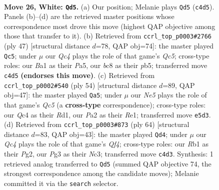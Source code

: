 \documentclass[11pt]{article}
\begin{document}
\clearpage

\begin{figure}[p]\centering
\begin{subfigure}{0.46\textwidth}\centering
\resizebox{\linewidth}{!}{%
\newchessgame
\chessboard[
  setfen={r1b3k1/1p1nq2p/4r3/p3Npp1/2Q5/4P1P1/P4PKP/BR2R3 w - - 0 26},
  showmover=false,
  pgfstyle=straightmove, color=movearrow, markmove={c4-d5}
]}
\caption{}
\end{subfigure}\hfill
\begin{subfigure}{0.46\textwidth}\centering
\resizebox{\linewidth}{!}{%
\newchessgame
\chessboard[
  setfen={r2r2k1/1p3pp1/4p2p/pP3n2/2q5/P1N4R/2Q3PP/2B1KR2 b - - 4 24},
  showmover=false,
  pgfstyle=straightmove, color=movearrow, markmove={c4-c5}
]}
\caption{}
\end{subfigure}
\\[4pt]
\begin{subfigure}{0.46\textwidth}\centering
\resizebox{\linewidth}{!}{%
\newchessgame
\chessboard[
  setfen={3rr3/p1pn1q1k/2p4p/2Q2p2/4p3/1P4P1/P1P1NP1P/3RR1K1 w - - 1 28},
  showmover=false,
  pgfstyle=straightmove, color=movearrow, markmove={c5-a5}
]}
\caption{}
\end{subfigure}\hfill
\begin{subfigure}{0.46\textwidth}\centering
\resizebox{\linewidth}{!}{%
\newchessgame
\chessboard[
  setfen={5r1k/1b2q1p1/pp3n1p/3p4/PR3Q2/2N2B1P/1PP3PK/8 w - - 6 33},
  showmover=false,
  pgfstyle=straightmove, color=movearrow, markmove={f4-d4}
]}
\caption{}
\end{subfigure}
\caption{\textbf{Move 26, White: \texttt{Qd5}.} (a) Our position; Melanie plays \texttt{Qd5} (\texttt{c4d5}). Panels (b)--(d) are the retrieved master positions whose correspondence most drove this move (highest QAP objective among those that transfer to it). (b) Retrieved from \texttt{ccrl\_top\_p0003\#2766} (ply 47) [structural distance $d$=78, QAP obj=74]: the master played \texttt{Qc5}; under $\mu$ our \emph{Qc4} plays the role of that game's \emph{Qc5}; cross-type roles: our \emph{B}a1 as their \emph{P}a5, our \emph{b}c8 as their \emph{p}b5; transferred move \texttt{c4d5} \textbf{(endorses this move)}. (c) Retrieved from \texttt{ccrl\_top\_p0002\#540} (ply 54) [structural distance $d$=89, QAP obj=47]: the master played \texttt{Qa5}; under $\mu$ our \emph{Ne5} plays the role of that game's \emph{Qc5} (a \textbf{cross-type} correspondence); cross-type roles: our \emph{Q}c4 as their \emph{R}d1, our \emph{P}a2 as their \emph{R}e1; transferred move \texttt{e5d3}. (d) Retrieved from \texttt{ccrl\_top\_p0003\#873} (ply 64) [structural distance $d$=83, QAP obj=43]: the master played \texttt{Qd4}; under $\mu$ our \emph{Qc4} plays the role of that game's \emph{Qf4}; cross-type roles: our \emph{R}b1 as their \emph{P}g2, our \emph{P}g3 as their \emph{N}c3; transferred move \texttt{c4d3}. Synthesis: 1 retrieved analog transferred to \texttt{Qd5} (summed QAP objective 74, the strongest correspondence among the candidate moves); Melanie committed it via the \texttt{search} selector.}
\label{fig:thought-m50}
\end{figure}
\end{document}
